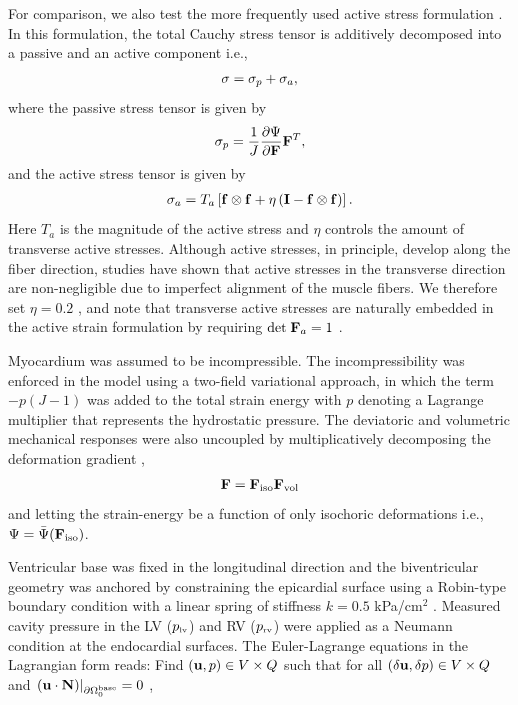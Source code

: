 For comparison, we also test the more frequently used active stress
formulation \citep{hunter1998modelling}. In this formulation, the total Cauchy
stress tensor is additively decomposed into a passive and an active component i.e.,
\begin{align}
  \mathbf{\sigma} = \mathbf{\sigma}_p + \mathbf{\sigma}_a,
\end{align}
where the passive stress tensor is given by
\begin{align}
  \mathbf{\sigma}_p = \frac{1}{J} \frac{\partial \Psi}{\partial \mathbf{F}}\mathbf{F}^T,
\end{align}
and the active stress tensor is given by
\begin{align}
  \mathbf{\sigma}_a = T_a \left[\mathbf{f} \otimes \mathbf{f} +
   \eta\left(\mathbf{I} - \mathbf{f} \otimes \mathbf{f} \right)\right].
  \label{paper3:eq:active_stress}
\end{align}
Here $T_a$ is the magnitude of the active stress and $\eta$ controls
the amount of transverse active stresses.
Although active stresses, in principle, develop along the fiber
direction, studies have shown \citep{lin1998multiaxial} that active
stresses in the transverse direction are non-negligible due to
imperfect alignment of the muscle fibers. We therefore set $\eta =
0.2$ \citep{sundnes2014improved}, and note that transverse active
stresses are naturally embedded in the active strain formulation by
requiring $\mathrm{det}\;\mathbf{F}_a = 1$ .

Myocardium was assumed to be incompressible. The incompressibility was
enforced in the model using a two-field variational approach, in which
the term $-p(J-1)$ was added to the total strain energy with $p$
denoting a Lagrange multiplier that represents the hydrostatic
pressure. The deviatoric and volumetric mechanical responses were also
uncoupled by multiplicatively decomposing the deformation gradient
\citep{weiss1996finite}, 
\begin{align}
  \mathbf{F} = \mathbf{F}_{\mathrm{iso}}\mathbf{F}_{\mathrm{vol}}
  \label{paper3:eq:deviatoric_split}
\end{align}
and letting the strain-energy be a function of only isochoric
deformations i.e., $\Psi = \bar{\Psi}(\mathbf{F}_{\mathrm{iso}})$.
  
Ventricular base was fixed in the longitudinal direction and the
biventricular geometry was anchored by constraining the
epicardial surface using a Robin-type boundary condition with a linear
spring of stiffness $k=0.5$ kPa/cm$^2$ \citep{xi2016patient}.
Measured cavity pressure in the LV ($p_{\textnormal{\tiny{lv}}}$) and RV ($p_{\textnormal{\tiny{rv}}}$) were
applied as a Neumann condition at the endocardial surfaces.
The Euler-Lagrange equations in the Lagrangian form reads: Find
$(\mathbf{u}, p) \in V \times Q$ such that for all $ (\delta \mathbf{u}, \delta
p) \in V \times Q$ and $\left. \left( \mathbf{u} \cdot \mathbf{N} \right)
\right|_{\partial \Omega_0^{\mathrm{base}}} = 0$ ,

